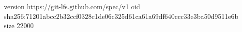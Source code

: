version https://git-lfs.github.com/spec/v1
oid sha256:71201abcc2b32ccf0328c1de06c325d61ca61a69df640ccc33e3ba50d9511e6b
size 22000

